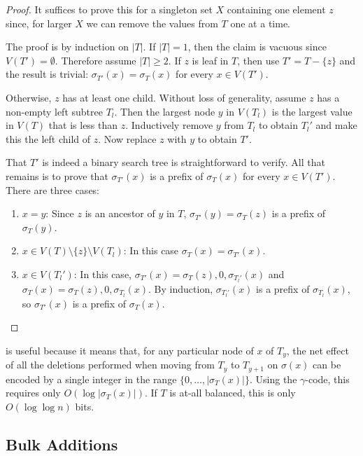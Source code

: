 \documentclass[kpfonts]{patmorin}
\begin{document}
\begin{proof}
  It suffices to prove this for a singleton set $X$ containing one element $z$ since, for larger $X$ we can remove the values from $T$ one at a time.  
  
  The proof is by induction on $|T|$. If $|T|=1$, then the claim is vacuous since $V(T')=\emptyset$.  Therefore assume $|T|\ge 2$.  If $z$ is leaf in $T$, then use $T'=T-\{z\}$ and the result is trivial: $\sigma_{T'}(x)=\sigma_T(x)$ for every $x\in V(T')$.  
  
  Otherwise, $z$ has at least one child.  Without loss of generality, assume $z$ has a non-empty left subtree $T_l$.  Then the largest node $y$ in $V(T_l)$ is the largest value in $V(T)$ that is less than $z$. Inductively remove $y$ from $T_l$ to obtain $T_l'$ and make this the left child of $z$.  Now replace $z$ with $y$ to obtain $T'$.  
  
  That $T'$ is indeed a binary search tree is straightforward to verify.  All that remains is to prove that $\sigma_{T'}(x)$ is a prefix of $\sigma_T(x)$ for every $x\in V(T')$. There are three cases:
  \begin{enumerate}
    \item $x=y$: Since $z$ is an ancestor of $y$ in $T$, $\sigma_{T'}(y)=\sigma_T(z)$ is a prefix of $\sigma_T(y)$.  
    
    \item $x\in V(T)\setminus\{z\}\setminus V(T_l)$: In this case $\sigma_T(x)=\sigma_{T'}(x)$.  
    
    \item $x\in V(T_l')$: In this case, $\sigma_{T'}(x)=\sigma_{T}(z),0,\sigma_{T_l'}(x)$ and $\sigma_T(x)=\sigma_{T}(z),0,\sigma_{T_l}(x)$.  By induction, $\sigma_{T_l'}(x)$ is a prefix of $\sigma_{T_l}(x)$, so $\sigma_{T'}(x)$ is a prefix of $\sigma_T(x)$. \qedhere
  \end{enumerate}
\end{proof}

 is useful because it means that, for any particular node of $x$ of $T_y$, the net effect of all the deletions performed when moving from $T_y$ to $T_{y+1}$ on $\sigma(x)$ can be encoded by a single integer in the range $\{0,\ldots,|\sigma_T(x)|\}$.  Using the $\gamma$-code, this requires only $O(\log |\sigma_T(x)|)$.  If $T$ is at-all balanced, this is only $O(\log\log n)$ bits.



\subsection{Bulk Additions}
\end{document}
